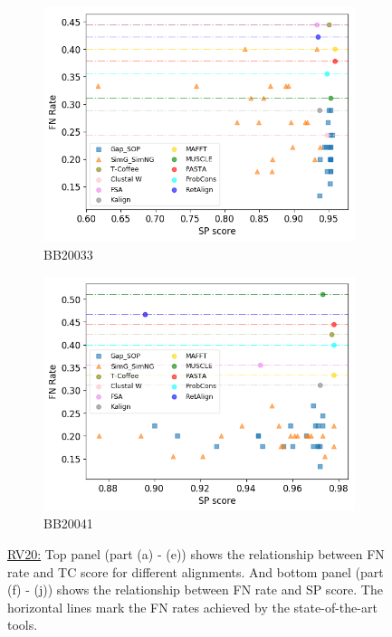\begin{figure}[!htbp]
\begin{adjustwidth}{-1cm}{-1cm}
\begin{subfigure}{0.22\textwidth}
			\includegraphics[width=\columnwidth]{Figure/summary/precomputedInit/Balibase/BB20033_fnrate_vs_sp_2}
			\caption{BB20033}
		\end{subfigure}	
		\begin{subfigure}{0.22\textwidth}
			\includegraphics[width=\columnwidth]{Figure/summary/precomputedInit/Balibase/BB20041_fnrate_vs_sp_2}
			\caption{BB20041}
		\end{subfigure}
		\caption{\underline{RV20:} Top panel (part (a) - (e)) shows the relationship between FN rate and TC score for different alignments. And bottom panel (part (f) - (j)) shows the relationship between FN rate and SP score. The horizontal lines mark the FN rates achieved by the state-of-the-art tools.}
		\label{fig:rv20_fnrate_vs_tc}
	\end{adjustwidth}
\end{figure}
